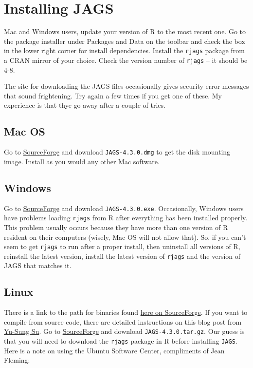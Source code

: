 \documentclass[12pt,english]{article}
\begin{document}
\section{Installing JAGS}

Mac and Windows users, update your version of R to the most recent one. Go to the package installer under \textsf{Packages and Data} on the toolbar and check the box in the lower right corner for \textsf{install dependencies}. Install the \texttt{rjags} package \citep{Plummer2016rjags} from a CRAN mirror of your choice. Check the version number of \texttt{rjags} -- it should be 4-8. 

The site for downloading the JAGS files occasionally gives security error messages that sound frightening.  Try again a few times if you get one of these.  My experience is that thye go away after a couple of tries.

\subsection{Mac OS}

Go to \href{https://sourceforge.net/projects/mcmc-jags/files/JAGS/4.x/Mac}{SourceForge} and download \texttt{JAGS-4.3.0.dmg} to get the disk mounting image. Install as you would any other Mac software.

\subsection{Windows}

Go to \href{https://sourceforge.net/projects/mcmc-jags/files/JAGS/4.x/Windows}{SourceForge} and download \texttt{JAGS-4.3.0.exe}. Occasionally, Windows users have problems loading \texttt{rjags} from R after everything has been installed properly.  This problem usually occurs because they have more than one version of R resident on their computers (wisely, Mac OS will not allow that). So, if you can't seem to get \texttt{rjags} to run after a proper install, then uninstall all versions of R, reinstall the latest version, install the latest version of \texttt{rjags} and the version of JAGS that matches it. 

\subsection{Linux}

There is a link to the path for binaries found \href{http://mcmc-jags.sourceforge.net}{here on SourceForge}. If you want to compile from source code, there are detailed instructions on this blog post from \href{http://yusung.blogspot.com/2009/01/install-jags-and-rjags-in-fedora.html}{Yu-Sung Su}. Go to \href{https://sourceforge.net/projects/mcmc-jags/files/JAGS/4.x/Source/}{SourceForge} and download \texttt{JAGS-4.3.0.tar.gz}. Our guess is that you will need to download the \texttt{rjags} package in R before installing \texttt{JAGS}.  Here is a note on using the Ubuntu Software Center, compliments of Jean Fleming:
\end{document}
